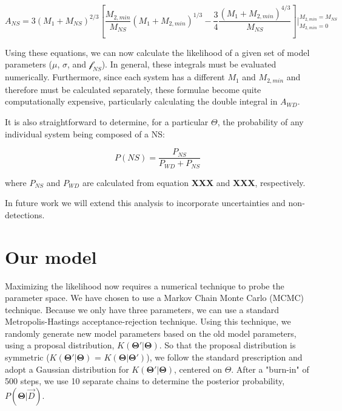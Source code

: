 \documentclass[letterpaper,12pt,preprint]{aastex}
\begin{document}
\begin{equation}
A_{NS} = 3 \left(M_1+M_{NS}\right)^{2/3} \left[  \frac{M_{2,min}}{M_{NS}} \left( M_1+M_{2,min} \right)^{1/3} - \frac{3}{4} \frac{ \left( M_1 + M_{2,min} \right)^{4/3} }{M_{NS}} \right] |_{M_{2,min}=0}^{M_{2,min}=M_{NS}}
\end{equation}

Using these equations, we can now calculate the likelihood of a given set of model parameters ($\mu$, $\sigma$, and $\mathcal{f}_{NS}$). In general, these integrals must be evaluated numerically. Furthermore, since each system has a different $M_1$ and $M_{2,min}$ and therefore must be calculated separately, these formulae become quite computationally expensive, particularly calculating the double integral in $A_{WD}$. 


It is also straightforward to determine, for a particular $\Theta$, the probability of any individual system being composed of a NS:

\begin{equation}
P(NS) = \frac{P_{NS}}{P_{WD} + P_{NS}}
\end{equation}

where $P_{NS}$ and $P_{WD}$ are calculated from equation {\bf XXX} and {\bf XXX}, respectively.  

In future work we will extend this analysis to incorporate uncertainties and non-detections. 



\section{Our model}


Maximizing the likelihood now requires a numerical technique to probe the parameter space. We have chosen to use a Markov Chain Monte Carlo (MCMC) technique. Because we only have three parameters, we can use a standard Metropolis-Hastings acceptance-rejection technique. Using this technique, we randomly generate new model parameters based on the old model parameters, using a proposal distribution, $K(\mathbf{\Theta '} | \mathbf{\Theta})$. So that the proposal distribution is symmetric ($K(\mathbf{\Theta '} | \mathbf{\Theta})$ = $K(\mathbf{\Theta} | \mathbf{\Theta '})$), we follow the standard prescription and adopt a Gaussian distribution for $K(\mathbf{\Theta '} | \mathbf{\Theta})$, centered on $\Theta$. After a "burn-in" of 500 steps, we use 10 separate chains to determine the posterior probability, $P(\mathbf{\Theta} | \vec{D})$.
\end{document}
